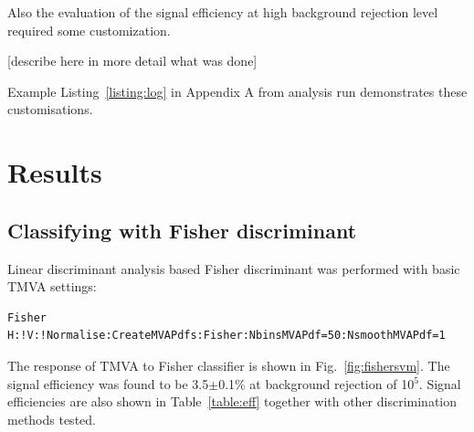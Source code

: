 \documentclass[a4paper]{jpconf}
\begin{document}
Also the evaluation of the signal efficiency at high background rejection
level required some customization.

[describe here in more detail what was done]

Example Listing~\ref{listing:log} in Appendix A from analysis run demonstrates these customisations.


\section{Results}\label{sec:results}

\subsection{Classifying with Fisher discriminant}
Linear discriminant analysis  based Fisher discriminant
was performed with basic TMVA settings:

\begin{verbatim}
Fisher H:!V:!Normalise:CreateMVAPdfs:Fisher:NbinsMVAPdf=50:NsmoothMVAPdf=1
\end{verbatim}

The response of TMVA to Fisher classifier is shown in Fig.~\ref{fig:fishersvm}. 
The signal efficiency was found to be 3.5$\pm$0.1\% at background rejection of 10$^5$.
Signal efficiencies are also shown in Table~\ref{table:eff} together with other discrimination methods tested.
 
\end{document}
